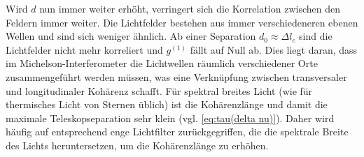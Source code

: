 Wird $d$ nun immer weiter erhöht, verringert sich die Korrelation zwischen den Feldern immer weiter. 
Die Lichtfelder bestehen aus immer verschiedeneren ebenen Wellen und sind sich weniger ähnlich. 
Ab einer Separation $d_0 \approx \Delta l_c$ sind die Lichtfelder nicht mehr korreliert und $g^{(1)}$ fällt auf Null ab. 
Dies liegt daran, dass im Michelson-Interferometer die Lichtwellen räumlich verschiedener Orte zusammengeführt werden müssen, was eine Verknüpfung zwischen transversaler und longitudinaler Kohärenz schafft. 
Für spektral breites Licht (wie für thermisches Licht von Sternen üblich) ist die Kohärenzlänge und damit die maximale Teleskopseparation sehr klein (vgl. \autoref{eq:tau(delta nu)}). 
Daher wird häufig auf entsprechend enge Lichtfilter zurückgegriffen, die die spektrale Breite des Lichts heruntersetzen, um die Kohärenzlänge zu erhöhen. \\


